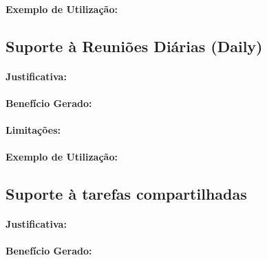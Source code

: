 \paragraph{Exemplo de Utilização:}
\label{par:exemplo_de_utilização_s07}

\subsection{Suporte à Reuniões Diárias (Daily)}
\label{sub:suporte_reunicao_diarias}


\paragraph{Justificativa:}
\label{par:justificativa_s08}

\paragraph{Benefício Gerado:}
\label{par:papéis_afetados_s08}

\paragraph{Limitações:}
\label{par:limitacoes_s08}

\paragraph{Exemplo de Utilização:}
\label{par:exemplo_de_utilização_s08}

\subsection{Suporte à tarefas compartilhadas}
\label{sub:suporte_tarefas_compartilhadas}


\paragraph{Justificativa:}
\label{par:justificativa_s09}

\paragraph{Benefício Gerado:}
\label{par:papéis_afetados_s09}

